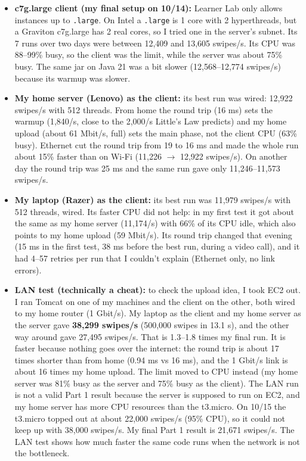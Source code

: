 \documentclass[10pt]{article}
\begin{document}
\begin{itemize}
  \item \textbf{c7g.large client (my final setup on 10/14):} Learner Lab only allows instances up to \texttt{.large}. On Intel a \texttt{.large} is 1 core with 2 hyperthreads, but a Graviton c7g.large has 2 real cores, so I tried one in the server's subnet. Its 7 runs over two days were between 12,409 and 13,605 swipes/s. Its CPU was 88--99\% busy, so the client was the limit, while the server was about 75\% busy. The same jar on Java 21 was a bit slower (12,568--12,774 swipes/s) because its warmup was slower.
  \item \textbf{My home server (Lenovo) as the client:} its best run was wired: 12,922 swipes/s with 512 threads. From home the round trip (16 ms) sets the warmup (1,840/s, close to the 2,000/s Little's Law predicts) and my home upload (about 61 Mbit/s, full) sets the main phase, not the client CPU (63\% busy). Ethernet cut the round trip from 19 to 16 ms and made the whole run about 15\% faster than on Wi-Fi (11,226 $\to$ 12,922 swipes/s). On another day the round trip was 25 ms and the same run gave only 11,246--11,573 swipes/s.
  \item \textbf{My laptop (Razer) as the client:} its best run was 11,979 swipes/s with 512 threads, wired. Its faster CPU did not help: in my first test it got about the same as my home server (11,174/s) with 66\% of its CPU idle, which also points to my home upload (59 Mbit/s). Its round trip changed that evening (15 ms in the first test, 38 ms before the best run, during a video call), and it had 4--57 retries per run that I couldn't explain (Ethernet only, no link errors).
  \item \textbf{LAN test (technically a cheat):} to check the upload idea, I took EC2 out. I ran Tomcat on one of my machines and the client on the other, both wired to my home router (1 Gbit/s). My laptop as the client and my home server as the server gave \textbf{38,299 swipes/s} (500,000 swipes in 13.1 s), and the other way around gave 27,495 swipes/s. That is 1.3--1.8 times my final run. It is faster because nothing goes over the internet: the round trip is about 17 times shorter than from home (0.94 ms vs 16 ms), and the 1 Gbit/s link is about 16 times my home upload. The limit moved to CPU instead (my home server was 81\% busy as the server and 75\% busy as the client). The LAN run is not a valid Part 1 result because the server is supposed to run on EC2, and my home server has more CPU resources than the t3.micro. On 10/15 the t3.micro topped out at about 22,000 swipes/s (95\% CPU), so it could not keep up with 38,000 swipes/s. My final Part 1 result is 21,671 swipes/s. The LAN test shows how much faster the same code runs when the network is not the bottleneck.
\end{itemize}
\end{document}
